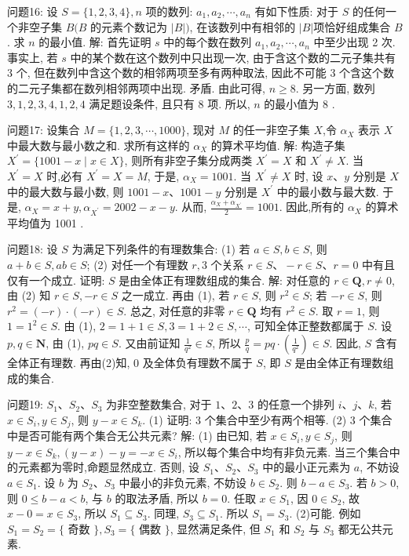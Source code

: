 问题16: 设 $S=\{1,2,3,4\}, n$ 项的数列: $a_1, a_2, \cdots, a_n$ 有如下性质: 对于 $S$ 的任何一个非空子集 $B(B$ 的元素个数记为 $|B|)$, 在该数列中有相邻的 $|B|$项恰好组成集合 $B$. 求 $n$ 的最小值.
解: 首先证明 $s$ 中的每个数在数列 $a_1, a_2, \cdots, a_n$ 中至少出现 2 次.
事实上, 若 $s$ 中的某个数在这个数列中只出现一次, 由于含这个数的二元子集共有 3 个, 但在数列中含这个数的相邻两项至多有两种取法, 因此不可能 3 个含这个数的二元子集都在数列相邻两项中出现.
矛盾.
由此可得, $n \geqslant 8$. 另一方面, 数列 $3,1,2,3,4,1,2,4$ 满足题设条件, 且只有 8 项.
所以, $n$ 的最小值为 8 .



问题17: 设集合 $M=\{1,2,3, \cdots, 1000\}$, 现对 $M$ 的任一非空子集 $X$,令 $\alpha_X$ 表示 $X$ 中最大数与最小数之和.
求所有这样的 $\alpha_X$ 的算术平均值.
解: 构造子集 $X^{\prime}=\{1001-x \mid x \in X\}$, 则所有非空子集分成两类 $X^{\prime}=X$ 和 $X^{\prime} \neq X$. 当 $X^{\prime}=X$ 时,必有 $X^{\prime}=X=M$, 于是, $\alpha_X=1001$. 当 $X^{\prime} \neq X$ 时, 设 $x 、 y$ 分别是 $X$ 中的最大数与最小数, 则 $1001-x 、 1001-y$ 分别是 $X^{\prime}$ 中的最小数与最大数.
于是, $\alpha_X=x+y, \alpha_{X^{\prime}}=2002-x-y$. 从而, $\frac{\alpha_X+\alpha_{X^{\prime}}}{2}=1001$. 因此,所有的 $\alpha_X$ 的算术平均值为 1001 .



问题18: 设 $S$ 为满足下列条件的有理数集合:
(1) 若 $a \in S, b \in S$, 则 $a+b \in S, a b \in S$;
(2) 对任一个有理数 $r, 3$ 个关系 $r \in S 、-r \in S 、 r=0$ 中有且仅有一个成立.
证明: $S$ 是由全体正有理数组成的集合.
解: 对任意的 $r \in \mathbf{Q}, r \neq 0$, 由 (2) 知 $r \in S,-r \in S$ 之一成立.
再由 (1), 若 $r \in S$, 则 $r^2 \in S$; 若 $-r \in S$, 则 $r^2=(-r) \cdot(-r) \in S$. 总之, 对任意的非零 $r \in \mathbf{Q}$ 均有 $r^2 \in S$. 取 $r=1$, 则 $1=1^2 \in S$. 由 (1), $2=1+1 \in S, 3=1+ 2 \in S, \cdots$, 可知全体正整数都属于 $S$. 设 $p, q \in \mathbf{N}$, 由 (1), $p q \in S$. 又由前证知 $\frac{1}{q^2} \in S$, 所以 $\frac{p}{q}=p q \cdot\left(\frac{1}{q^2}\right) \in S$. 因此, $S$ 含有全体正有理数.
再由(2)知, 0 及全体负有理数不属于 $S$, 即 $S$ 是由全体正有理数组成的集合.



问题19: $S_1 、 S_2 、 S_3$ 为非空整数集合, 对于 $1 、 2 、 3$ 的任意一个排列 $i 、 j 、 k$, 若 $x \in S_i, y \in S_j$, 则 $y-x \in S_k$.
(1) 证明: 3 个集合中至少有两个相等.
(2) 3 个集合中是否可能有两个集合无公共元素?
解: (1) 由已知, 若 $x \in S_i, y \in S_j$, 则 $y-x \in S_k,(y-x)-y= -x \in S_i$, 所以每个集合中均有非负元素.
当三个集合中的元素都为零时,命题显然成立.
否则, 设 $S_1 、 S_2 、 S_3$ 中的最小正元素为 $a$, 不妨设 $a \in S_1$. 设 $b$ 为 $S_2 、 S_3$ 中最小的非负元素, 不妨设 $b \in S_2$. 则 $b-a \in S_3$. 若 $b>0$, 则 $0 \leqslant b- a<b$, 与 $b$ 的取法矛盾, 所以 $b=0$. 任取 $x \in S_1$, 因 $0 \in S_2$, 故 $x-0=x \in S_3$, 所以 $S_1 \subseteq S_3$. 同理, $S_3 \subseteq S_1$. 所以 $S_1=S_3$.
(2)可能.
例如 $S_1=S_2=\{$ 奇数 $\}, S_3=\{$ 偶数 $\}$, 显然满足条件, 但 $S_1$ 和 $S_2$ 与 $S_3$ 都无公共元素.



